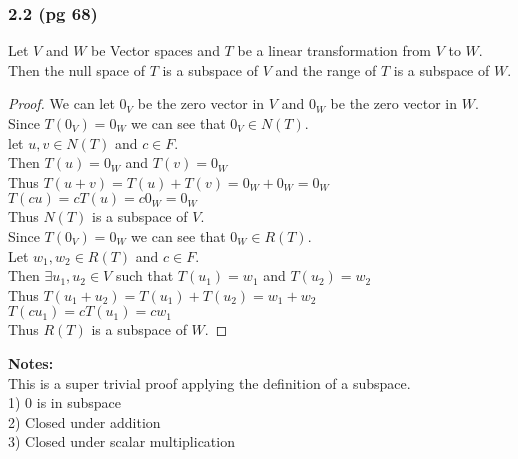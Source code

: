\documentclass[answers,12pt,addpoints]{exam}
\begin{document}
\subsubsection{2.2 (pg 68)}
Let $V$ and $W$ be Vector spaces and $T$ be a linear transformation from $V$ to $W$. Then the null space of $T$ is a subspace of $V$ and the range of $T$ is a subspace of $W$.
\begin{proof}
    We can let $0_V$ be the zero vector in $V$ and $0_W$ be the zero vector in $W$.\\
    Since $T(0_V) = 0_W$ we can see that $0_V \in N(T)$.\\
    let $u,v \in N(T)$ and $c \in F$.\\
    Then $T(u) = 0_W$ and $T(v) = 0_W$\\
    Thus $T(u+v) = T(u) + T(v) = 0_W + 0_W = 0_W$\\
    $T(cu) = cT(u) = c0_W = 0_W$\\
    Thus $N(T)$ is a subspace of $V$.\\
    Since $T(0_V) = 0_W$ we can see that $0_W \in R(T)$.\\
    Let $w_1, w_2 \in R(T)$ and $c \in F$.\\
    Then $\exists u_1, u_2 \in V$ such that $T(u_1) = w_1$ and $T(u_2) = w_2$\\
    Thus $T(u_1 + u_2) = T(u_1) + T(u_2) = w_1 + w_2$\\
    $T(cu_1) = cT(u_1) = cw_1$\\
    Thus $R(T)$ is a subspace of $W$.
\end{proof}
\textbf{Notes:}\\
This is a super trivial proof applying the definition of a subspace.\\
1) 0 is in subspace\\
2) Closed under addition\\
3) Closed under scalar multiplication\\
\end{document}
